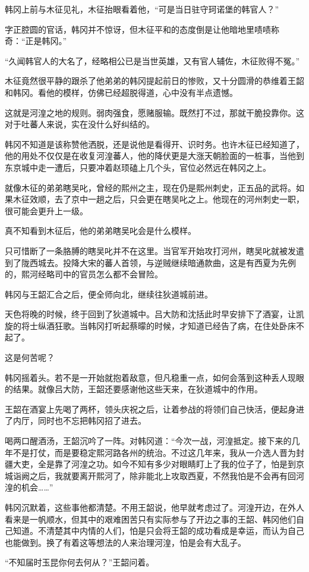 韩冈上前与木征见礼，木征抬眼看着他，“可是当日驻守珂诺堡的韩官人？”

字正腔圆的官话，韩冈并不惊讶，但木征平和的态度倒是让他暗地里啧啧称奇：“正是韩冈。”

“久闻韩官人的大名了，经略相公已是当世英雄，又有官人辅佐，木征败得不冤。”

木征竟然很平静的跟杀了他弟弟的韩冈提起前日的惨败，又十分圆滑的恭维着王韶和韩冈。看他的模样，仿佛已经超脱得道，心中没有半点遗憾。

这就是河湟之地的规则。弱肉强食，愿赌服输。既然打不过，那就干脆投靠你。这对于吐蕃人来说，实在没什么好纠结的。

韩冈不知道是该称赞他洒脱，还是说他是看得开、识时务。也许木征已经知道了，他的用处不仅仅是在收复河湟蕃人，他的降伏更是大涨天朝脸面的一桩事，当他到东京城中走一遭后，只要冲着赵顼磕上几个头，官位必然远在韩冈之上。

就像木征的弟弟瞎吴叱，曾经的熙州之主，现在仍是熙州刺史，正五品的武将。如果木征效顺，去了京中一趟之后，只会更在瞎吴叱之上。他现在的河州刺史一职，很可能会更升上一级。

真不知看到木征后，他的弟弟瞎吴叱会是什么模样。

只可惜断了一条胳膊的瞎吴叱并不在这里。当官军开始攻打河州，瞎吴叱就被发遣到了陇西城去。投降大宋的蕃人首领，与逆贼继续暗通款曲，这是有西夏为先例的，熙河经略司中的官员怎么都不会冒险。

韩冈与王韶汇合之后，便全师向北，继续往狄道城前进。

天色将晚的时候，终于回到了狄道城中。吕大防和沈括此时早安排下了酒宴，让凯旋的将士纵酒狂歌。当韩冈打听起蔡曚的时候，才知道已经告了病，在住处卧床不起了。

这是何苦呢？

韩冈摇着头。若不是一开始就抱着敌意，但凡稳重一点，如何会落到这种丢人现眼的结果。就像吕大防，王韶还要感谢他这些天来，在狄道城中的作用。

王韶在酒宴上先喝了两杯，领头庆祝之后，让着参战的将领们自己快活，便起身进了内厅，同时也不忘把韩冈招了进去。

喝两口醒酒汤，王韶沉吟了一阵。对韩冈道：“今次一战，河湟抵定。接下来的几年不是打仗，而是要稳定熙河路各州的统治。不过这几年来，我从一介选人晋为封疆大吏，全是靠了河湟之功。如今不知有多少对眼睛盯上了我的位子了，怕是到京城诣阙之后，我就要离开熙河了，除非能北上攻取西夏，不然我怕是不会再有回河湟的机会……”

韩冈沉默着，这些事他都清楚。不用王韶说，他早就考虑过了。河湟开边，在外人看来是一帆顺水，但其中的艰难困苦只有实际参与了开边之事的王韶、韩冈他们自己知道。不清楚其中内情的人们，怕是只会将王韶的成功看成是幸运，而认为自己也能做到。换了有着这等想法的人来治理河湟，怕是会有大乱子。

“不知届时玉昆你何去何从？”王韶问着。

